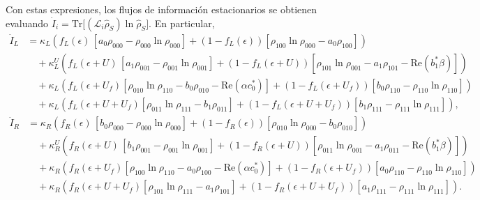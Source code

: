 \begin{appendixs}
Con estas expresiones, los flujos de información estacionarios se obtienen evaluando
$\dot{I}_{i} = \mathrm{Tr}\!\big[(\mathcal{L}_{i}\hat{\rho}_{S}) \ln \hat{\rho}_{S}\big]$. En particular,
\begin{align*}
    \dot{I}_{L} &  =
      \kappa_{L}\!\left(f_{L}(\epsilon)\,[a_{0}\rho_{000} - \rho_{000}\ln \rho_{000}] + (1-f_{L}(\epsilon))[\rho_{100}\ln \rho_{000} - a_{0}\rho_{100}] \right) \\ 
      &\quad + \kappa^{U}_{L}\!\left(f_{L}(\epsilon + U)\,[a_{1}\rho_{001} - \rho_{001}\ln \rho_{001}] + (1-f_{L}(\epsilon + U))[\rho_{101}\ln \rho_{001} -a_{1}\rho_{101} - \mathrm{Re}(b^{*}_{1}\beta )] \right) \\  
      &\quad + \kappa_{L}\!\left( f_{L}(\epsilon + U_{f})[\rho_{010}\ln \rho_{110} -b_{0}\rho_{010} - \mathrm{Re}(\alpha c^{*}_{0})]  + (1-f_{L}(\epsilon + U_{f}))[b_{0}\rho_{110} - \rho_{110}\ln \rho_{110}] \right) \\  
      &\quad + \kappa_{L}\!\left( f_{L}(\epsilon + U + U_{f})[\rho_{011}\ln \rho_{111}- b_{1}\rho_{011}] + (1-f_{L}(\epsilon+U+U_{f}) )[b_{1}\rho_{111} - \rho_{111}\ln \rho_{111}] \right),
\end{align*}
\begin{align*}
    \dot{I}_{R} &  =
      \kappa_{R}\!\left(f_{R}(\epsilon)\,[b_{0}\rho_{000} - \rho_{000}\ln \rho_{000}] + (1-f_{R}(\epsilon))[\rho_{010}\ln \rho_{000} - b_{0}\rho_{010}] \right) \\ 
      &\quad + \kappa^{U}_{R}\!\left(f_{R}(\epsilon + U)\,[b_{1} \rho_{001} - \rho_{001}\ln \rho_{001}] + (1-f_{R}(\epsilon + U))[\rho_{011}\ln \rho_{001} -a_{1}\rho_{011} - \mathrm{Re}(b^{*}_{1}\beta )] \right) \\  
      &\quad + \kappa_{R}\!\left( f_{R}(\epsilon + U_{f})[\rho_{100}\ln \rho_{110} -a_{0}\rho_{100} - \mathrm{Re}(\alpha c^{*}_{0})]  + (1-f_{R}(\epsilon + U_{f}))[a_{0}\rho_{110} - \rho_{110}\ln \rho_{110}] \right) \\  
      &\quad + \kappa_{R}\!\left( f_{R}(\epsilon + U + U_{f})[\rho_{101}\ln \rho_{111}- a_{1}\rho_{101}] + (1-f_{R}(\epsilon+U+U_{f}) )[a_{1}\rho_{111} - \rho_{111}\ln \rho_{111}] \right).
\end{align*}


\end{appendixs}
